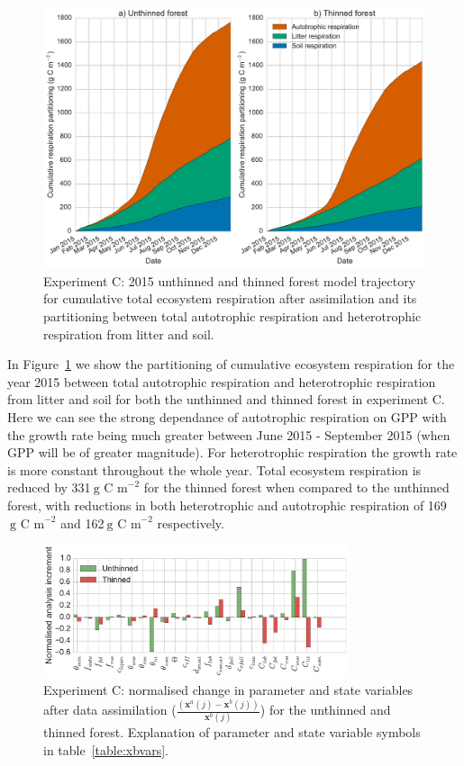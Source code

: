 \documentclass[draft,linenumbers]{agujournal}
\begin{document}
\begin{figure}[ht]
    \centering
        \includegraphics[width=\textwidth]{resp_partc.pdf}
    \caption{Experiment C: 2015 unthinned and thinned forest model trajectory for cumulative total ecosystem respiration after assimilation and its partitioning between total autotrophic respiration and heterotrophic respiration from litter and soil.} \label{fig:rt_part}
\end{figure}

In Figure~\ref{fig:rt_part} we show the partitioning of cumulative ecosystem respiration for the year 2015 between total autotrophic respiration and heterotrophic respiration from litter and soil for both the unthinned and thinned forest in experiment C. Here we can see the strong dependance of autotrophic respiration on GPP with the growth rate being much greater between June 2015 - September 2015 (when GPP will be of greater magnitude). For heterotrophic respiration the growth rate is more constant throughout the whole year. Total ecosystem respiration is reduced by 331\(~\text{g C m}^{-2}\) for the thinned forest when compared to the unthinned forest, with reductions in both heterotrophic and autotrophic respiration of 169\(~\text{g C m}^{-2}\) and 162\(~\text{g C m}^{-2}\) respectively.    

\begin{figure}[ht]
    \centering
    \includegraphics[width=0.8\textwidth]{xa_incc.pdf}
    \caption{Experiment C: normalised change in parameter and state variables after data assimilation \big($\frac{(\textbf{x}^a(j) - \textbf{x}^b(j))}{\textbf{x}^b(j)}$\big) for the unthinned and thinned forest. Explanation of parameter and state variable symbols in table~\ref{table:xbvars}.}
    \label{fig:xa_inc}
\end{figure}
\end{document}

